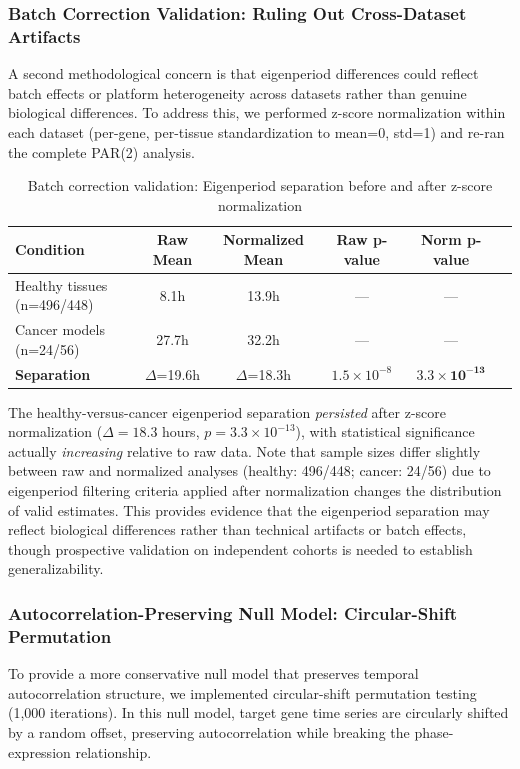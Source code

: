 \documentclass[11pt,a4paper]{article}
\begin{document}
\subsubsection{Batch Correction Validation: Ruling Out Cross-Dataset Artifacts}

A second methodological concern is that eigenperiod differences could reflect batch effects or platform heterogeneity across datasets rather than genuine biological differences. To address this, we performed z-score normalization within each dataset (per-gene, per-tissue standardization to mean=0, std=1) and re-ran the complete PAR(2) analysis.

\begin{table}[H]
\centering
\caption{Batch correction validation: Eigenperiod separation before and after z-score normalization}
\label{tab:batch_correction}
\begin{tabular}{lccccc}
\toprule
Condition & Raw Mean & Normalized Mean & Raw p-value & Norm p-value \\
\midrule
Healthy tissues (n=496/448) & 8.1h & 13.9h & --- & --- \\
Cancer models (n=24/56) & 27.7h & 32.2h & --- & --- \\
\midrule
\textbf{Separation} & $\Delta$=19.6h & $\Delta$=18.3h & $1.5\times10^{-8}$ & $\mathbf{3.3\times10^{-13}}$ \\
\bottomrule
\end{tabular}
\end{table}

The healthy-versus-cancer eigenperiod separation \textit{persisted} after z-score normalization ($\Delta = 18.3$ hours, $p = 3.3 \times 10^{-13}$), with statistical significance actually \textit{increasing} relative to raw data. Note that sample sizes differ slightly between raw and normalized analyses (healthy: 496/448; cancer: 24/56) due to eigenperiod filtering criteria applied after normalization changes the distribution of valid estimates. This provides evidence that the eigenperiod separation may reflect biological differences rather than technical artifacts or batch effects, though prospective validation on independent cohorts is needed to establish generalizability.

\subsubsection{Autocorrelation-Preserving Null Model: Circular-Shift Permutation}

To provide a more conservative null model that preserves temporal autocorrelation structure, we implemented circular-shift permutation testing (1,000 iterations). In this null model, target gene time series are circularly shifted by a random offset, preserving autocorrelation while breaking the phase-expression relationship.
\end{document}
